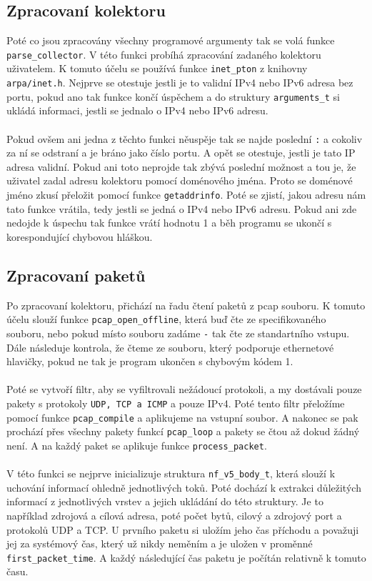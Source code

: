 \documentclass[12pt]{article}
\begin{document}
\subsection{Zpracovaní kolektoru}
Poté co jsou zpracovány všechny programové argumenty tak se volá funkce \texttt{parse\_collector}. V této funkci probíhá zpracování zadaného kolektoru uživatelem.
K tomuto účelu se používá funkce \texttt{inet\_pton} z knihovny \texttt{arpa/inet.h}. Nejprve se otestuje jestli je to validní IPv4 nebo IPv6 adresa bez portu, pokud ano
tak funkce končí úspěchem a do struktury \texttt{arguments\_t} si ukládá informaci, jestli se jednalo o IPv4 nebo IPv6 adresu.
\\\\
Pokud ovšem ani jedna z těchto funkci něuspěje tak se najde poslední \texttt{:} a cokoliv za ní se odstraní a je bráno jako číslo portu. A opět se otestuje, jestli je tato IP adresa validní.
Pokud ani toto neprojde tak zbývá poslední možnost a tou je, že uživatel zadal adresu kolektoru pomocí doménového jména.
Proto se doménové jméno zkusí přeložit pomocí funkce \texttt{getaddrinfo}. Poté se zjistí, jakou adresu nám tato funkce vrátila, tedy jestli se jedná o IPv4 nebo IPv6 adresu.
Pokud ani zde nedojde k úspechu tak funkce vrátí hodnotu 1 a běh programu se ukončí s korespondující chybovou hláškou.

\subsection{Zpracovaní paketů}
Po zpracovaní kolektoru, přichází na řadu čtení paketů z pcap souboru. K tomuto účelu slouží funkce \texttt{pcap\_open\_offline}, která buď čte ze specifikovaného souboru, nebo pokud místo souboru zadáme \texttt{-} tak čte ze standartního vstupu.
Dále následuje kontrola, že čteme ze souboru, který podporuje ethernetové hlavičky, pokud ne tak je program ukončen s chybovým kódem 1.
\\\\
Poté se vytvoří filtr, aby se vyfiltrovali nežádoucí protokoli, a my dostávali pouze pakety s protokoly \texttt{UDP, TCP a ICMP} a pouze IPv4. Poté tento filtr přeložíme pomocí funkce \texttt{pcap\_compile} a aplikujeme na vstupní soubor.
A nakonec se pak prochází přes všechny pakety funkcí \texttt{pcap\_loop} a pakety se čtou až dokud žádný není. A na každý paket se aplikuje funkce \texttt{process\_packet}.
\\\\
V této funkci se nejprve inicializuje struktura \texttt{nf\_v5\_body\_t}, která slouží k uchování informací ohledně jednotlivých toků. Poté dochází k extrakci důležitých informací
z jednotlivých vrstev a jejich ukládání do této struktury. Je to například zdrojová a cílová adresa, poté počet bytů, cilový a zdrojový port a protokolů UDP a TCP. U prvního paketu si
uložím jeho čas příchodu a považuji jej za systémový čas, který už nikdy neměním a je uložen v proměnné \texttt{first\_packet\_time}. A každý následující čas paketu je počítán relativně k tomuto času.
\end{document}
